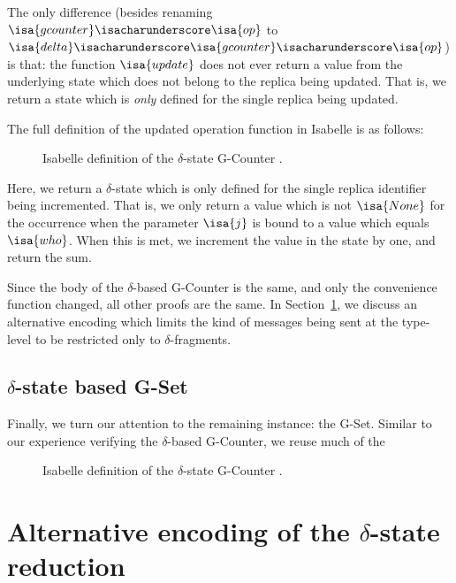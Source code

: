 The only difference (besides renaming $\isa{gcounter}\isacharunderscore\isa{op}$
to $\isa{delta}\isacharunderscore\isa{gcounter}\isacharunderscore\isa{op}$) is
that: the function $\isa{update}$ does not ever return a value from the
underlying state which does not belong to the replica being updated. That is, we
return a state which is \emph{only} defined for the single replica being
updated.

The full definition of the updated operation function in Isabelle is as follows:

\begin{figure}[H]
  
  \caption{Isabelle definition of the $\delta$-state G-Counter \CRDT.}
\end{figure}

Here, we return a $\delta$-state which is only defined for the single replica
identifier being incremented. That is, we only return a value which is not
$\isa{None}$ for the occurrence when the parameter $\isa{j}$ is bound to a value
which equals $\isa{who}$. When this is met, we increment the value in the state
by one, and return the sum.

Since the body of the $\delta$-based G-Counter \CRDT is the same, and only the
convenience function changed, all other proofs are the same. In
Section~\ref{sec:alternate-delta-encoding}, we discuss an alternative encoding
which limits the kind of messages being sent at the type-level to be restricted
only to $\delta$-fragments.

\subsection{$\delta$-state based G-Set}

Finally, we turn our attention to the remaining \CRDT instance: the G-Set.
Similar to our experience verifying the $\delta$-based G-Counter, we reuse much
of the

\begin{figure}[H]
  
  \caption{Isabelle definition of the $\delta$-state G-Counter \CRDT.}
\end{figure}


\section{Alternative encoding of the $\delta$-state reduction}
\label{sec:alternate-delta-encoding}

